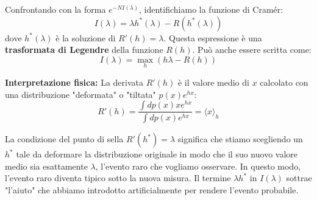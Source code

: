 Confrontando con la forma $e^{-NI(\lambda)}$, identifichiamo la funzione di Cramér:
\begin{equation}
 I(\lambda) = \lambda h^*(\lambda) - R(h^*(\lambda))
\end{equation}
dove $h^*(\lambda)$ è la soluzione di $R'(h) = \lambda$. Questa espressione è una \textbf{trasformata di Legendre} della funzione $R(h)$. Può anche essere scritta come:
\begin{equation}
 I(\lambda) = \max_h (h\lambda - R(h))
\end{equation}

\textbf{Interpretazione fisica:}
La derivata $R'(h)$ è il valore medio di $x$ calcolato con una distribuzione "deformata" o "tiltata" $p(x)e^{hx}$:
\begin{equation}
 R'(h) = \frac{\int dp(x) x e^{hx}}{\int dp(x) e^{hx}} = \langle x \rangle_h
\end{equation}

\begin{tcolorbox}[colback=yellow!30,  
                  colframe=yellow!50!orange,  
                  boxrule=0.8pt, 
                  arc=3pt,  
                  top=4pt, bottom=4pt, left=6pt, right=6pt,
                  enhanced,
                  sharp corners=south]
La condizione del punto di sella $R'(h^*) = \lambda$ significa che stiamo scegliendo un $h^*$ tale da deformare la distribuzione originale in modo che il suo nuovo valore medio sia esattamente $\lambda$, l'evento raro che vogliamo osservare. In questo modo, l'evento raro diventa tipico sotto la nuova misura. Il termine $\lambda h^*$ in $I(\lambda)$ sottrae "l'aiuto" che abbiamo introdotto artificialmente per rendere l'evento probabile.
\end{tcolorbox}


